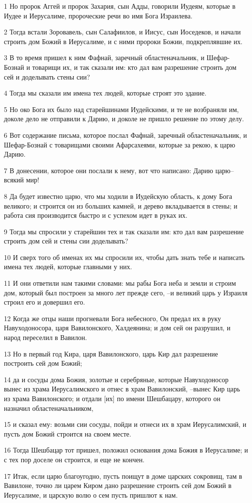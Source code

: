 \par 1 Но пророк Аггей и пророк Захария, сын Адды, говорили Иудеям, которые в Иудее и Иерусалиме, пророческие речи во имя Бога Израилева.
\par 2 Тогда встали Зоровавель, сын Салафиилов, и Иисус, сын Иоседеков, и начали строить дом Божий в Иерусалиме, и с ними пророки Божии, подкреплявшие их.
\par 3 В то время пришел к ним Фафнай, заречный областеначальник, и Шефар-Бознай и товарищи их, и так сказали им: кто дал вам разрешение строить дом сей и доделывать стены сии?
\par 4 Тогда мы сказали им имена тех людей, которые строят это здание.
\par 5 Но око Бога их было над старейшинами Иудейскими, и те не возбраняли им, доколе дело не отправили к Дарию, и доколе не пришло решение по этому делу.
\par 6 Вот содержание письма, которое послал Фафнай, заречный областеначальник, и Шефар-Бознай с товарищами своими Афарсахеями, которые за рекою, к царю Дарию.
\par 7 В донесении, которое они послали к нему, вот что написано: Дарию царю--всякий мир!
\par 8 Да будет известно царю, что мы ходили в Иудейскую область, к дому Бога великого; и строится он из больших камней, и дерево вкладывается в стены; и работа сия производится быстро и с успехом идет в руках их.
\par 9 Тогда мы спросили у старейшин тех и так сказали им: кто дал вам разрешение строить дом сей и стены сии доделывать?
\par 10 И сверх того об именах их мы спросили их, чтобы дать знать тебе и написать имена тех людей, которые главными у них.
\par 11 И они ответили нам такими словами: мы рабы Бога неба и земли и строим дом, который был построен за много лет прежде сего, --и великий царь у Израиля строил его и довершил его.
\par 12 Когда же отцы наши прогневали Бога небесного, Он предал их в руку Навуходоносора, царя Вавилонского, Халдеянина; и дом сей он разрушил, и народ переселил в Вавилон.
\par 13 Но в первый год Кира, царя Вавилонского, царь Кир дал разрешение построить сей дом Божий;
\par 14 да и сосуды дома Божия, золотые и серебряные, которые Навуходоносор вынес из храма Иерусалимского и отнес в храм Вавилонский, --вынес Кир царь из храма Вавилонского; и отдали [их] по имени Шешбацару, которого он назначил областеначальником,
\par 15 и сказал ему: возьми сии сосуды, пойди и отнеси их в храм Иерусалимский, и пусть дом Божий строится на своем месте.
\par 16 Тогда Шешбацар тот пришел, положил основания дома Божия в Иерусалиме; и с тех пор доселе он строится, и еще не кончен.
\par 17 Итак, если царю благоугодно, пусть поищут в доме царских сокровищ, там в Вавилоне, точно ли царем Киром дано разрешение строить сей дом Божий в Иерусалиме, и царскую волю о сем пусть пришлют к нам.

